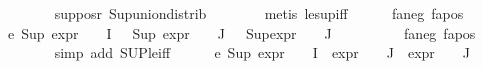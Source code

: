 \begin{isabellebody}
\ \ \ \ \ \ \isamarkupfalse%
\ sup{\isacharunderscore}{\kern0pt}pos{\isacharunderscore}{\kern0pt}r\ Sup{\isacharunderscore}{\kern0pt}union{\isacharunderscore}{\kern0pt}distrib\isanewline
\ \ \ \ \ \ \isamarkupfalse%
\ {\isacharparenleft}{\kern0pt}metis\ le{\isacharunderscore}{\kern0pt}sup{\isacharunderscore}{\kern0pt}iff{\isacharparenright}{\kern0pt}\isanewline
\ \ \ \ \isamarkupfalse%
\ fa{\isacharunderscore}{\kern0pt}neg\ fa{\isacharunderscore}{\kern0pt}pos\ \isamarkupfalse%
\ e{}{\isacharcolon}{\kern0pt}\ {\isachardoublequoteopen}Sup\ {\isacharparenleft}{\kern0pt}{\isacharparenleft}{\kern0pt}expr{\isacharunderscore}{\kern0pt}{}\ {\isasymcirc}\ {\isasymPhi}{\isacharparenright}{\kern0pt}\ {\isacharbackquote}{\kern0pt}\ I{\isacharparenright}{\kern0pt}\ {\isasymle}\ {}{\isachardoublequoteclose}\ {\isachardoublequoteopen}Sup\ {\isacharparenleft}{\kern0pt}{\isacharparenleft}{\kern0pt}expr{\isacharunderscore}{\kern0pt}{}\ {\isasymcirc}\ {\isasymPhi}{\isacharparenright}{\kern0pt}\ {\isacharbackquote}{\kern0pt}\ J{\isacharparenright}{\kern0pt}\ {\isasymle}\ {}{\isachardoublequoteclose}\ {\isachardoublequoteopen}Sup{\isacharparenleft}{\kern0pt}{\isacharparenleft}{\kern0pt}expr{\isacharunderscore}{\kern0pt}{}\ {\isasymcirc}\ {\isasymPhi}{\isacharparenright}{\kern0pt}\ {\isacharbackquote}{\kern0pt}\ J{\isacharparenright}{\kern0pt}\ {\isasymle}\ {}{\isachardoublequoteclose}\isanewline
\ \ \ \ \ \ \isamarkupfalse%
\ fa{\isacharunderscore}{\kern0pt}neg\ fa{\isacharunderscore}{\kern0pt}pos\ \isanewline
\ \ \ \ \ \ \isamarkupfalse%
\ {\isacharparenleft}{\kern0pt}simp\ add{\isacharcolon}{\kern0pt}\ SUP{\isacharunderscore}{\kern0pt}le{\isacharunderscore}{\kern0pt}iff{\isacharparenright}{\kern0pt}{\isacharplus}{\kern0pt}\isanewline
\ \ \ \ \isamarkupfalse%
\ e{}{\isacharcolon}{\kern0pt}\ {\isachardoublequoteopen}{\isacharparenleft}{\kern0pt}Sup\ {\isacharparenleft}{\kern0pt}{\isacharparenleft}{\kern0pt}expr{\isacharunderscore}{\kern0pt}{}\ {\isasymcirc}\ {\isasymPhi}{\isacharparenright}{\kern0pt}\ {\isacharbackquote}{\kern0pt}\ I\ {\isasymunion}\ {\isacharparenleft}{\kern0pt}expr{\isacharunderscore}{\kern0pt}{}\ {\isasymcirc}\ {\isasymPhi}{\isacharparenright}{\kern0pt}\ {\isacharbackquote}{\kern0pt}\ J\ {\isasymunion}\ {\isacharparenleft}{\kern0pt}expr{\isacharunderscore}{\kern0pt}{}\ {\isasymcirc}\ {\isasymPhi}{\isacharparenright}{\kern0pt}\ {\isacharbackquote}{\kern0pt}\ J{\isacharparenright}{\kern0pt}{\isacharparenright}{\kern0pt}\ {\isasymle}\ {}{\isachardoublequoteclose}\isanewline

\end{isabellebody}
